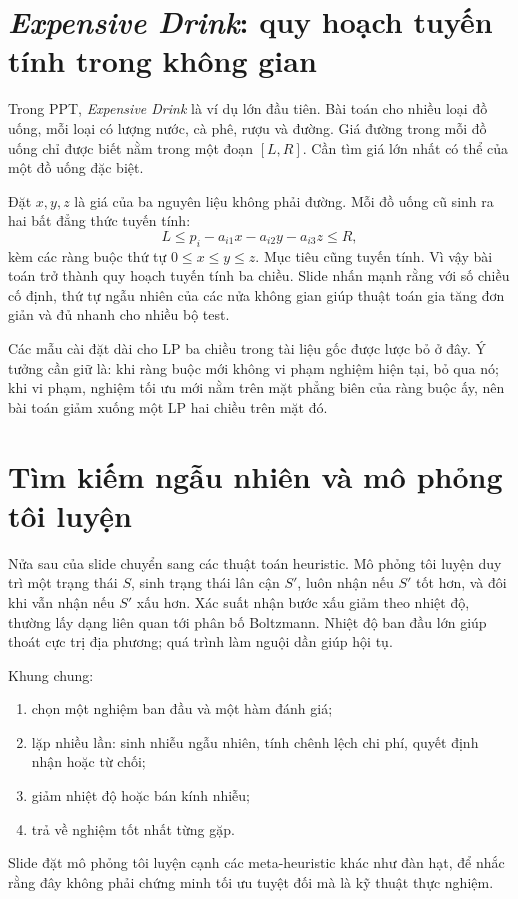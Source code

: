 \documentclass[11pt]{article}
\begin{document}
\section{\textit{Expensive Drink}: quy hoạch tuyến tính trong không gian}

Trong PPT, \textit{Expensive Drink} là ví dụ lớn đầu tiên. Bài toán cho nhiều
loại đồ uống, mỗi loại có lượng nước, cà phê, rượu và đường. Giá đường trong
mỗi đồ uống chỉ được biết nằm trong một đoạn \([L,R]\). Cần tìm giá lớn nhất
có thể của một đồ uống đặc biệt.

Đặt \(x,y,z\) là giá của ba nguyên liệu không phải đường. Mỗi đồ uống cũ sinh
ra hai bất đẳng thức tuyến tính:
\[
  L \le p_i-a_{i1}x-a_{i2}y-a_{i3}z \le R,
\]
kèm các ràng buộc thứ tự \(0\le x\le y\le z\). Mục tiêu cũng tuyến tính. Vì
vậy bài toán trở thành quy hoạch tuyến tính ba chiều. Slide nhấn mạnh rằng
với số chiều cố định, thứ tự ngẫu nhiên của các nửa không gian giúp thuật toán
gia tăng đơn giản và đủ nhanh cho nhiều bộ test.

Các mẫu cài đặt dài cho LP ba chiều trong tài liệu gốc được lược bỏ ở đây. Ý
tưởng cần giữ là: khi ràng buộc mới không vi phạm nghiệm hiện tại, bỏ qua nó;
khi vi phạm, nghiệm tối ưu mới nằm trên mặt phẳng biên của ràng buộc ấy, nên
bài toán giảm xuống một LP hai chiều trên mặt đó.

\section{Tìm kiếm ngẫu nhiên và mô phỏng tôi luyện}

Nửa sau của slide chuyển sang các thuật toán heuristic. Mô phỏng tôi luyện
duy trì một trạng thái \(S\), sinh trạng thái lân cận \(S'\), luôn nhận nếu
\(S'\) tốt hơn, và đôi khi vẫn nhận nếu \(S'\) xấu hơn. Xác suất nhận bước xấu
giảm theo nhiệt độ, thường lấy dạng liên quan tới phân bố Boltzmann. Nhiệt độ
ban đầu lớn giúp thoát cực trị địa phương; quá trình làm nguội dần giúp hội
tụ.

Khung chung:
\begin{enumerate}
  \item chọn một nghiệm ban đầu và một hàm đánh giá;
  \item lặp nhiều lần: sinh nhiễu ngẫu nhiên, tính chênh lệch chi phí, quyết
  định nhận hoặc từ chối;
  \item giảm nhiệt độ hoặc bán kính nhiễu;
  \item trả về nghiệm tốt nhất từng gặp.
\end{enumerate}
Slide đặt mô phỏng tôi luyện cạnh các meta-heuristic khác như đàn hạt, để nhắc
rằng đây không phải chứng minh tối ưu tuyệt đối mà là kỹ thuật thực nghiệm.
\end{document}
